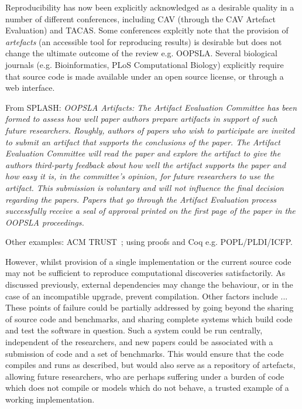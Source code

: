 \documentclass{llncs}
\begin{document}
Reproducibility has now been explicitly acknowledged as a desirable quality in a number of 
different conferences, including CAV (through the CAV Artefact Evaluation) and TACAS. Some conferences explcitly note that 
the provision of \emph{artefacts} (an accessible tool for reproducing results) is desirable
but does not change the ultimate outcome of the review e.g. OOPSLA. Several biological journals
(e.g. Bioinformatics, PLoS Computational Biology) explicitly require that source code is
made available under an open source license, or through a web interface. 


From SPLASH: {\emph{OOPSLA Artifacts: The Artifact Evaluation Committee has been formed
to assess how well paper authors prepare artifacts in support of such
future researchers. Roughly, authors of papers who wish to participate
are invited to submit an artifact that supports the conclusions of the
paper. The Artifact Evaluation Committee will read the paper and
explore the artifact to give the authors third-party feedback about
how well the artifact supports the paper and how easy it is, in the
committee’s opinion, for future researchers to use the artifact. This
submission is voluntary and will not influence the final decision
regarding the papers. Papers that go through the Artifact Evaluation
process successfully receive a seal of approval printed on the first
page of the paper in the OOPSLA proceedings.}}

Other examples: ACM TRUST~\cite{fursin+dubach:2014}; using proofs and
Coq e.g. POPL/PLDI/ICFP.


However, whilst provision of a single implementation or the current source
code may not be sufficient to reproduce computational discoveries satisfactorily.
As discussed previously, external dependencies may change the behaviour, or 
in the case of an incompatible upgrade, prevent compilation. Other factors include
... These points of failure could be partially addressed by going beyond the sharing
of source code and benchmarks, and sharing complete systems which build code and 
test the software in question. Such a system could be run centrally, independent of 
the researchers, and new papers could be associated with a submission of code and
a set of benchmarks. This would ensure that the code compiles and runs as described,
but would also serve as a repository of artefacts, allowing future researchers,
who are perhaps suffering under a burden of code which does not compile or models
which do not behave, a trusted example of a working implementation.
\end{document}

